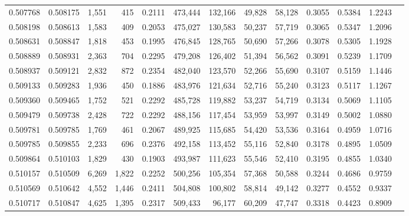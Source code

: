 \begin{tabular}{rrrrrrrrrrrrr}
0.507768 & 0.508175 &  1,551 &   415 &                                     0.2111 & 473,444 & 132,166 &  49,828 &  58,128 & 0.3055 & 0.5384 & 1.2243 \\
0.508198 & 0.508613 &  1,583 &   409 &                                     0.2053 & 475,027 & 130,583 &  50,237 &  57,719 & 0.3065 & 0.5347 & 1.2096 \\
0.508631 & 0.508847 &  1,818 &   453 &                                     0.1995 & 476,845 & 128,765 &  50,690 &  57,266 & 0.3078 & 0.5305 & 1.1928 \\
0.508889 & 0.508931 &  2,363 &   704 &                                     0.2295 & 479,208 & 126,402 &  51,394 &  56,562 & 0.3091 & 0.5239 & 1.1709 \\
0.508937 & 0.509121 &  2,832 &   872 &                                     0.2354 & 482,040 & 123,570 &  52,266 &  55,690 & 0.3107 & 0.5159 & 1.1446 \\
0.509133 & 0.509283 &  1,936 &   450 &                                     0.1886 & 483,976 & 121,634 &  52,716 &  55,240 & 0.3123 & 0.5117 & 1.1267 \\
0.509360 & 0.509465 &  1,752 &   521 &                                     0.2292 & 485,728 & 119,882 &  53,237 &  54,719 & 0.3134 & 0.5069 & 1.1105 \\
0.509479 & 0.509738 &  2,428 &   722 &                                     0.2292 & 488,156 & 117,454 &  53,959 &  53,997 & 0.3149 & 0.5002 & 1.0880 \\
0.509781 & 0.509785 &  1,769 &   461 &                                     0.2067 & 489,925 & 115,685 &  54,420 &  53,536 & 0.3164 & 0.4959 & 1.0716 \\
0.509785 & 0.509855 &  2,233 &   696 &                                     0.2376 & 492,158 & 113,452 &  55,116 &  52,840 & 0.3178 & 0.4895 & 1.0509 \\
0.509864 & 0.510103 &  1,829 &   430 &                                     0.1903 & 493,987 & 111,623 &  55,546 &  52,410 & 0.3195 & 0.4855 & 1.0340 \\
0.510157 & 0.510509 &  6,269 & 1,822 &                                     0.2252 & 500,256 & 105,354 &  57,368 &  50,588 & 0.3244 & 0.4686 & 0.9759 \\
0.510569 & 0.510642 &  4,552 & 1,446 &                                     0.2411 & 504,808 & 100,802 &  58,814 &  49,142 & 0.3277 & 0.4552 & 0.9337 \\
0.510717 & 0.510847 &  4,625 & 1,395 &                                     0.2317 & 509,433 &  96,177 &  60,209 &  47,747 & 0.3318 & 0.4423 & 0.8909 \\

\end{tabular}
